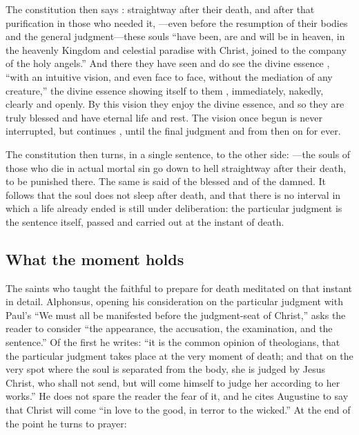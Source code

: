 The constitution then says : straightway after their death, and after that purification in those who needed it, ---even before the resumption of their bodies and the general judgment---these souls ``have been, are and will be in heaven, in the heavenly Kingdom and celestial paradise with Christ, joined to the company of the holy angels.'' And there they have seen and do see the divine essence , ``with an intuitive vision, and even face to face, without the mediation of any creature,'' the divine essence showing itself to them , immediately, nakedly, clearly and openly. By this vision they enjoy the divine essence, and so they are truly blessed and have eternal life and rest. The vision once begun is never interrupted, but continues , until the final judgment and from then on for ever.

The constitution then turns, in a single sentence, to the other side: ---the souls of those who die in actual mortal sin go down to hell straightway after their death, to be punished there. The same  is said of the blessed and of the damned. It follows that the soul does not sleep after death, and that there is no interval in which a life already ended is still under deliberation: the particular judgment is the sentence itself, passed and carried out at the instant of death.

\subsection{What the moment holds}

The saints who taught the faithful to prepare for death meditated on that instant in detail. Alphonsus, opening his consideration on the particular judgment with Paul's ``We must all be manifested before the judgment-seat of Christ,'' asks the reader to consider ``the appearance, the accusation, the examination, and the sentence.'' Of the first he writes: ``it is the common opinion of theologians, that the particular judgment takes place at the very moment of death; and that on the very spot where the soul is separated from the body, she is judged by Jesus Christ, who shall not send, but will come himself to judge her according to her works.'' He does not spare the reader the fear of it, and he cites Augustine to say that Christ will come ``in love to the good, in terror to the wicked.'' At the end of the point he turns to prayer:

